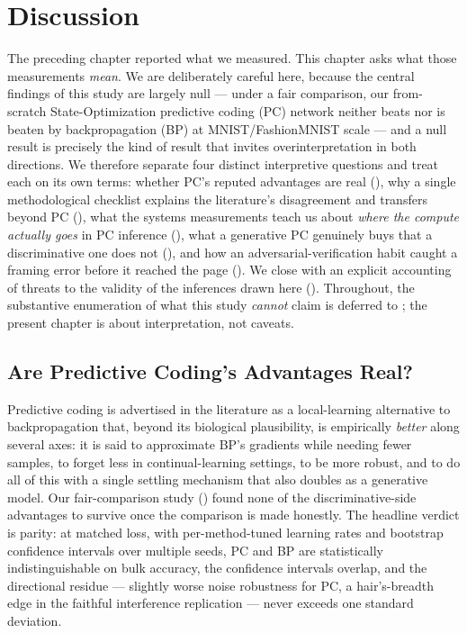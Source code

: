 \chapter{Discussion}\label{ch:discussion}

The preceding chapter reported what we measured. This chapter asks what those measurements
\emph{mean}. We are deliberately careful here, because the central findings of this study are
largely null --- under a fair comparison, our from-scratch State-Optimization predictive coding
(PC) network neither beats nor is beaten by backpropagation (BP) at MNIST/FashionMNIST scale ---
and a null result is precisely the kind of result that invites overinterpretation in both
directions. We therefore separate four distinct interpretive questions and treat each on its own
terms: whether PC's reputed advantages are real (), why a single methodological
checklist explains the literature's disagreement and transfers beyond PC
(), what the systems measurements teach us about \emph{where the compute
actually goes} in PC inference (), what a generative PC genuinely buys that a
discriminative one does not (), and how an adversarial-verification habit
caught a framing error before it reached the page (). We close with an
explicit accounting of threats to the validity of the inferences drawn here
(). Throughout, the substantive enumeration of what this study \emph{cannot}
claim is deferred to ; the present chapter is about interpretation, not
caveats.

\section{Are Predictive Coding's Advantages Real?}\label{sec:disc-real}

Predictive coding is advertised in the literature as a local-learning alternative to
backpropagation that, beyond its biological plausibility, is empirically \emph{better} along
several axes: it is said to approximate BP's gradients while needing fewer samples, to forget less
in continual-learning settings, to be more robust, and to do all of this with a single settling
mechanism that also doubles as a generative model. Our fair-comparison study
() found none of the discriminative-side advantages to survive once
the comparison is made honestly. The headline verdict is parity: at matched loss, with
per-method-tuned learning rates and bootstrap confidence intervals over multiple seeds, PC and BP
are statistically indistinguishable on bulk accuracy, the confidence intervals overlap, and the
directional residue --- slightly worse noise robustness for PC, a hair's-breadth edge in the
faithful interference replication --- never exceeds one standard deviation.

